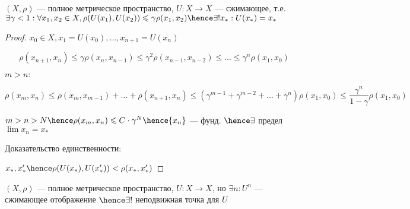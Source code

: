 \begin{theorem}
    $(X, \rho)$ --- полное метрическое пространство, $U : X \to X$ --- сжимающее, т.е. $\exists \gamma < 1 : \forall x_1, x_2 \in X, \rho(U(x_1), U(x_2)) \leqslant \gamma \rho (x_1, x_2) \hence \exists ! x_* : U(x_*) = x_*$
\end{theorem}

\begin{proof}
    $x_0 \in X, x_1 = U(x_0), ..., x_{n + 1} = U(x_n)$

    \[
        \rho(x_{n + 1}, x_n) \leqslant \gamma \rho (x_n, x_{n - 1}) \leqslant \gamma ^ 2 \rho (x_{n - 1}, x_{n - 2}) \leqslant ... \leqslant \gamma ^ n \rho(x_1, x_0)
    \]

    $m > n:$

    \[
        \rho(x_m, x_n) \leqslant \rho(x_m, x_{m - 1}) + ... + \rho(x_{n + 1}, x_n) \leqslant (\gamma ^ {m - 1} + \gamma^{m - 2} + ... + \gamma ^ n) \rho(x_1, x_0) \leqslant \frac{\gamma ^ n}{1 - \gamma} \rho(x_1, x_0)
    \]

    $m > n > N \hence \rho(x_m, x_n) \leqslant C \cdot \gamma ^ N \hence \{ x_n \}$ --- фунд. $\hence \exists$ предел $\lim x_n = x_*$

    Доказательство единственности:

    $x_*, x_*' \hence \rho(U(x_*), U(x_*')) < \rho(x_*, x_*')$
\end{proof}

\follow $(X, \rho)$ --- полное метрическое пространство, $U : X \to X$, но $\exists n : U ^ n$ --- сжимающее отображение $\hence \exists! $ неподвижная точка для $U$


